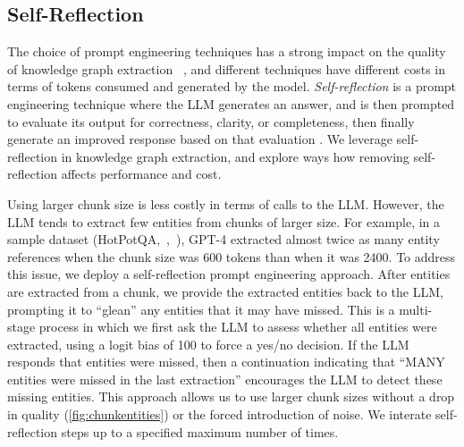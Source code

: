 \documentclass{article}
\begin{document}
\subsection{Self-Reflection}
\label{app:self_reflection}

The choice of prompt engineering techniques has a strong impact on the quality of knowledge graph extraction ~\citep{zhu2024llms}, and different techniques have different costs in terms of tokens consumed and generated by the model.
\emph{Self-reflection} is a prompt engineering technique where the LLM generates an answer, and is then prompted to evaluate its output for correctness, clarity, or completeness, then finally generate an improved response based on that evaluation \citep{huang2023large, shinn2024reflexion, wang2022self, madaan2024self}.
We leverage self-reflection in knowledge graph extraction, and explore ways how removing self-reflection affects performance and cost.

Using larger chunk size is less costly in terms of calls to the LLM.
However, the LLM tends to extract few entities from chunks of larger size.
For example, in a sample dataset (HotPotQA,~\citeauthor{yang2018hotpotqa},~\citeyear{yang2018hotpotqa}), GPT-4 extracted almost twice as many entity references when the chunk size was 600 tokens than when it was 2400.
To address this issue, we deploy a self-reflection prompt engineering approach.
After entities are extracted from a chunk, we provide the extracted entities back to the LLM, prompting it to ``glean'' any entities that it may have missed.
This is a multi-stage process in which we first ask the LLM to assess whether all entities were extracted, using a logit bias of 100 to force a yes/no decision.
If the LLM responds that entities were missed, then a continuation indicating that ``MANY entities were missed in the last extraction'' encourages the LLM to detect these missing entities.
This approach allows us to use larger chunk sizes without a drop in quality (\autoref{fig:chunkentities}) or the forced introduction of noise.
We interate self-reflection steps up to a specified maximum number of times.
\end{document}
